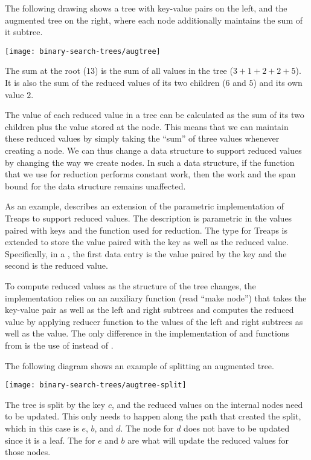 \begin{chapter}
\begin{example}
  The following drawing shows a tree with key-value pairs on the left,
  and the augmented tree on the right, where each node additionally
  maintains the sum of it subtree.
\begin{center}
  \texttt{[image: binary-search-trees/augtree]}
\end{center}
The sum at the root ($13$) is the sum of all values in the tree ($3 +
1 + 2 + 2 + 5$).    It is also the sum of the reduced values of its
two children ($6$ and $5$) and its own value $2$.
\end{example}







The value of each reduced value in a tree can be calculated as the sum
of its two children plus the value stored at the node.  This means
that we can maintain these reduced values by simply taking the
``sum'' of three values whenever creating a node.  We can thus change
a data structure to support reduced values by changing the way we
create nodes.  In such a data structure, if the function that we use
for reduction performs constant work, then the work and the span bound
for the data structure remains unaffected.

As an example,  describes an extension of the
parametric implementation of Treaps to support reduced values.  The
description is parametric in the values paired with keys and the
function  used for reduction.  
%
The type for Treaps is extended to store the value paired with the key
as well as the reduced value.  Specifically, in a , the
first data entry is the value paired by the key and the second is the
reduced value.
%


To compute reduced values as the structure of the tree changes, the
implementation relies on an auxiliary function  (read
``make node'') that takes the key-value pair as well as the left and
right subtrees and computes the reduced value by applying reducer
function to the values of the left and right subtrees as well as the
value.
%
The only difference in the implementation of  and
 functions from  is the use of 
instead of .  

\begin{example}
The following diagram shows an example of splitting an augmented tree.
\begin{center}
  \texttt{[image: binary-search-trees/augtree-split]}
\end{center}
The tree is split by the key $c$, and the reduced values on the
internal nodes need to be updated.  This only needs to happen along
the path that created the split, which in this case is $e$, $b$, and
$d$.  The node for $d$ does not have to be updated since it is a leaf.
The  for $e$ and $b$ are what will update the reduced
values for those nodes.
\end{example}


\end{chapter}
